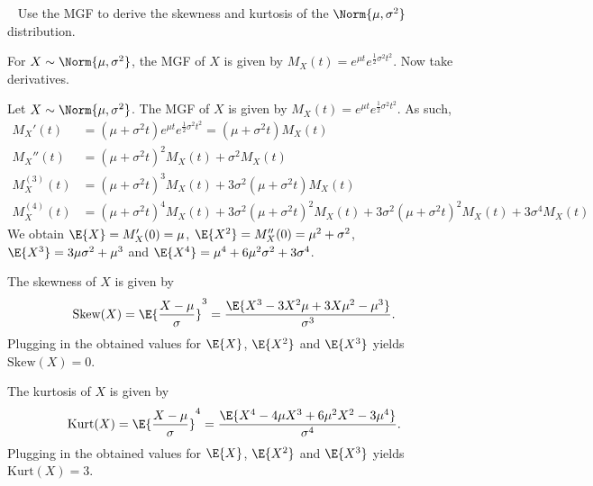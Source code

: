 	\begin{exercise}~
		Use the MGF to derive the skewness and kurtosis of the $\Norm{\mu,\sigma^2}$ distribution.
		\begin{hint}
			For $X \sim \Norm{\mu,\sigma^2}$, the MGF of $X$ is given by $M_X(t) = e^{\mu t} e^{\frac{1}{2} \sigma^2 t^2}$. Now take derivatives.
		\end{hint}
		\begin{solution}
			Let $X \sim \Norm{\mu,\sigma^2}$. The MGF of $X$ is given by $M_X(t) = e^{\mu t} e^{\frac{1}{2} \sigma^2 t^2}$. As such,
			\begin{align*}
				M_X'(t) & = (\mu + \sigma^2 t) e^{\mu t} e^{\frac{1}{2} \sigma^2 t^2} = (\mu + \sigma^2 t) M_X(t) \\
				M_X''(t) & = (\mu + \sigma^2 t)^2 M_X(t) + \sigma^2 M_X(t) \\
				M_X^{(3)}(t) & = (\mu + \sigma^2 t)^3 M_X(t) + 3 \sigma^2 (\mu + \sigma^2 t) M_X(t) \\
				M_X^{(4)}(t) & = (\mu + \sigma^2 t)^4 M_X(t) + 3 \sigma^2 (\mu + \sigma^2 t)^2 M_X(t) + 3 \sigma^2 (\mu + \sigma^2 t)^2 M_X(t) + 3 \sigma^4 M_X(t)
			\end{align*}	
			We obtain $\E{X} = M_X'(0) = \mu$, $\E{X^2} = M_X''(0) = \mu^2 + \sigma^2$, $\E{X^3} = 3 \mu \sigma^2 + \mu^3$ and $\E{X^4} = \mu^4 + 6 \mu^2 \sigma^2 + 3 \sigma^4$.
			
			The skewness of $X$ is given by
			\begin{align*}
				\text{Skew}(X) = \E{\frac{X - \mu}{\sigma}}^3 = \frac{\E{X^3 - 3X^2 \mu + 3X \mu^2 - \mu^3}}{\sigma^3}.
			\end{align*}	
			Plugging in the obtained values for $\E{X}$, $\E{X^2}$ and $\E{X^3}$ yields $\text{Skew}(X) = 0$.
			
			The kurtosis of $X$ is given by
			\begin{align*}
				\text{Kurt}(X) = \E{\frac{X - \mu}{\sigma}}^4 = \frac{\E{X^4 - 4 \mu X^3 + 6 \mu^2 X^2 - 3 \mu^4}}{\sigma^4}.
			\end{align*}	
			Plugging in the obtained values for $\E{X}$, $\E{X^2}$ and $\E{X^3}$ yields $\text{Kurt}(X) = 3$.
		\end{solution}
	\end{exercise}


